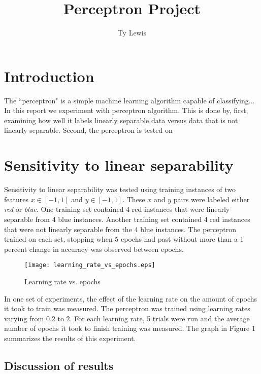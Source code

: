 \documentclass[12pt,letterpaper]{article}
\title{Perceptron Project}
\author{Ty Lewis}
\begin{document}
 
\section*{Introduction}
The ``perceptron" is a simple machine learning algorithm capable of classifying... In this report we experiment with perceptron algorithm. This is done by, first, examining how well it labels linearly separable data versus data that is not linearly separable. Second, the perceptron is tested on 

\section*{Sensitivity to linear separability}

Sensitivity to linear separability was tested using training instances of two features $x \in [-1, 1]$ and $y \in [-1, 1]$. These $x$ and $y$ pairs were labeled either \emph{red} or \emph{blue}. One training set contained 4 red instances that were linearly separable from 4 blue instances. Another training set contained 4 red instances that were not linearly separable from the 4 blue instances. The perceptron trained on each set, stopping when 5 epochs had past without more than a 1 percent change in accuracy was observed between epochs.

\begin{wrapfigure}{r}{0.6\textwidth}
\vspace{-20pt}
\centering
\texttt{[image: learning\_rate\_vs\_epochs.eps]} 
\vspace{-10pt}
\caption{Learning rate vs. epochs}
\vspace{-20pt}
\end{wrapfigure}

In one set of experiments, the effect of the learning rate on the amount of epochs it took to train was measured. The perceptron was trained using learning rates varying from $0.2$ to $2$. For each learning rate, 5 trials were run and the average number of epochs it took to finish training was measured. The graph in Figure 1 summarizes the results of this experiment.

\subsection*{Discussion of results}
\end{document}
